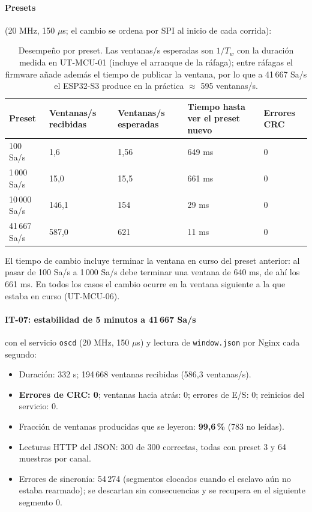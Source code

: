 \documentclass[12pt,a4paper]{article}
\begin{document}
\paragraph{Presets} (20 MHz, 150 $\mu$s; el cambio se ordena por SPI al inicio de cada corrida):

\begin{table}[H]
\centering
\small
\begin{tabular}{@{}p{2.4cm} p{2.6cm} p{2.6cm} p{3.4cm} p{2.6cm}@{}}
\toprule
\textbf{Preset} & \textbf{Ventanas/s recibidas} & \textbf{Ventanas/s esperadas} & \textbf{Tiempo hasta ver el preset nuevo} & \textbf{Errores CRC} \\
\midrule
100 Sa/s      & 1{,}6   & 1{,}56 & 649 ms & 0 \\
1\,000 Sa/s   & 15{,}0  & 15{,}5 & 661 ms & 0 \\
10\,000 Sa/s  & 146{,}1 & 154    & 29 ms  & 0 \\
41\,667 Sa/s  & 587{,}0 & 621    & 11 ms  & 0 \\
\bottomrule
\end{tabular}
\caption{Desempeño por preset. Las ventanas/s esperadas son $1/T_w$ con la duración medida en UT-MCU-01 (incluye el arranque de la ráfaga); entre ráfagas el firmware añade además el tiempo de publicar la ventana, por lo que a 41\,667 Sa/s el ESP32-S3 produce en la práctica $\approx$ 595 ventanas/s.}
\end{table}

El tiempo de cambio incluye terminar la ventana en curso del preset anterior: al pasar de 100 Sa/s a 1\,000 Sa/s debe terminar una ventana de 640 ms, de ahí los 661 ms. En todos los casos el cambio ocurre en la ventana siguiente a la que estaba en curso (UT-MCU-06).

\paragraph{IT-07: estabilidad de 5 minutos a 41\,667 Sa/s} con el servicio \texttt{oscd} (20 MHz, 150 $\mu$s) y lectura de \texttt{window.json} por Nginx cada segundo:

\begin{itemize}
  \item Duración: 332 s; 194\,668 ventanas recibidas (586{,}3 ventanas/s).
  \item \textbf{Errores de CRC: 0}; ventanas hacia atrás: 0; errores de E/S: 0; reinicios del servicio: 0.
  \item Fracción de ventanas producidas que se leyeron: \textbf{99{,}6\,\%} (783 no leídas).
  \item Lecturas HTTP del JSON: 300 de 300 correctas, todas con preset 3 y 64 muestras por canal.
  \item Errores de sincronía: 54\,274 (segmentos clocados cuando el esclavo aún no estaba rearmado); se descartan sin consecuencias y se recupera en el siguiente segmento 0.
\end{itemize}
\end{document}

